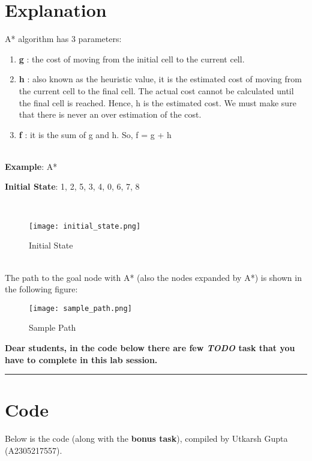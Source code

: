 \documentclass[11pt]{article}
\providecommand{\tightlist}{%
      \setlength{\itemsep}{0pt}\setlength{\parskip}{0pt}}
\begin{document}
    \section{Explanation}

A* algorithm has 3 parameters:

\begin{enumerate}
\def\labelenumi{\arabic{enumi}.}
\tightlist
\item
   \textbf{g} : the cost of moving from the initial cell to the current cell.
\item
   \textbf{h} : also known as the heuristic value, it is the estimated cost of
  moving from the current cell to the final cell. The actual cost cannot
  be calculated until the final cell is reached. Hence, h is the
  estimated cost. We must make sure that there is never an over
  estimation of the cost.
\item
   \textbf{f} : it is the sum of g and h. So, f = g + h
\end{enumerate}

    ~\\
    \textbf{Example}: A*

    \textbf{Initial State}: 1, 2, 5, 3, 4, 0, 6, 7, 8

~\\
\begin{figure}
\centering
\texttt{[image: initial\_state.png]}
\caption{Initial State}
\end{figure}
~\\

    The path to the goal node with A* (also the nodes expanded by A*) is
shown in the following figure:

\begin{figure}
\centering
\texttt{[image: sample\_path.png]}
\caption{Sample Path}
\end{figure}

    \textbf{Dear students, in the code below there are few \emph{TODO} task
that you have to complete in this lab session.}

    \noindent\rule{16.5cm}{0.4pt}
    \newpage

    \section{Code}

    Below is the code (along with the \textbf{bonus task}), compiled by Utkarsh Gupta (A2305217557).
    \vspace{3mm}
\end{document}
